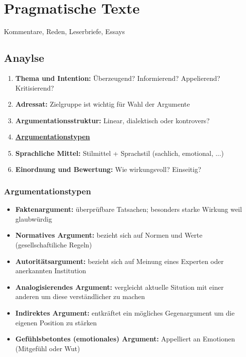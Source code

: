 
\section{Pragmatische Texte}

 Kommentare, Reden, Leserbriefe, Essays

\subsection{Anaylse}

\begin{enumerate}
    \item \textbf{Thema und Intention:} Überzeugend? Informierend? Appelierend? Kritisierend?
    \item \textbf{Adressat:} Zielgruppe ist wichtig für Wahl der Argumente
    \item \textbf{Argumentationsstruktur:} Linear, dialektisch oder kontrovers?
    \item \textbf{\hyperref[sec:argumentationstypen]{Argumentationstypen}}
    \item \textbf{Sprachliche Mittel:} Stilmittel + Sprachstil (sachlich, emotional, ...)
    \item \textbf{Einordnung und Bewertung:} Wie wirkungsvoll? Einseitig? 
\end{enumerate}


\subsubsection{Argumentationstypen}
\label{sec:argumentationstypen}
\begin{itemize}
    \item \textbf{Faktenargument:} überprüfbare Tatsachen; besonders starke Wirkung weil glaubwürdig
    \item \textbf{Normatives Argument:} bezieht sich auf Normen und Werte (gesellschaftiliche Regeln)
    \item \textbf{Autoritätsargument:} bezieht sich auf Meinung eines Experten oder anerkannten Institution
    \item \textbf{Analogisierendes Argument:} vergleicht aktuelle Sitution mit einer anderen um diese verständlicher zu machen
    \item \textbf{Indirektes Argument:} entkräftet ein mögliches Gegenargument um die eigenen Position zu stärken
    \item \textbf{Gefühlsbetontes (emotionales) Argument:} Appelliert an Emotionen (Mitgefühl oder Wut)
\end{itemize}
